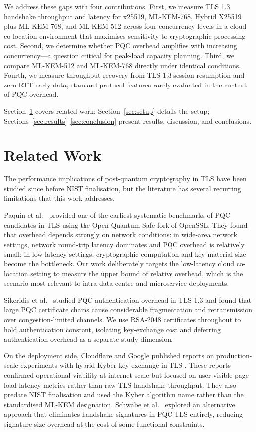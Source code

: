 \documentclass[conference]{IEEEtran}
\begin{document}
We address these gaps with four contributions. First, we measure TLS 1.3
handshake throughput and latency for x25519, ML-KEM-768,
Hybrid X25519 plus ML-KEM-768, and ML-KEM-512 across four concurrency levels in a cloud
co-location environment that maximises sensitivity to cryptographic processing cost.
Second, we determine whether PQC overhead amplifies with increasing concurrency---a
question critical for peak-load capacity planning. Third, we compare ML-KEM-512 and
ML-KEM-768 directly under identical conditions.
Fourth, we measure throughput recovery from TLS 1.3 session
resumption and zero-RTT early data, standard protocol features rarely
evaluated in the context of PQC overhead.

Section~\ref{sec:related} covers related work; Section~\ref{sec:setup} details the setup; Sections~\ref{sec:results}--\ref{sec:conclusion} present results, discussion, and conclusions.

\section{Related Work}
\label{sec:related}

The performance implications of post-quantum cryptography in TLS have been studied since
before NIST finalisation, but the literature has several recurring limitations that this
work addresses.

Paquin et al.~\cite{b8} provided one of the earliest systematic benchmarks of PQC
candidates in TLS using the Open Quantum Safe fork of OpenSSL. They found that overhead
depends strongly on network conditions: in wide-area network settings, network
round-trip latency dominates and PQC overhead is relatively small; in low-latency
settings, cryptographic computation and key material size become the bottleneck. Our work
deliberately targets the low-latency cloud co-location setting to measure the upper
bound of relative overhead, which is the scenario most relevant to intra-data-centre and
microservice deployments.

Sikeridis et al.~\cite{b9} studied PQC authentication overhead in TLS 1.3 and found
that large PQC certificate chains cause considerable fragmentation and retransmission
over congestion-limited channels. We use RSA-2048 certificates throughout to hold
authentication constant, isolating key-exchange cost and deferring authentication
overhead as a separate study dimension.

On the deployment side, Cloudflare and Google published reports on production-scale
experiments with hybrid Kyber key exchange in TLS \cite{b11}\cite{b12}\cite{b13}. These
reports confirmed operational viability at internet scale but focused on user-visible
page load latency metrics rather than raw TLS handshake throughput. They also predate
NIST finalisation and used the Kyber algorithm name rather than the standardised ML-KEM
designation. Schwabe et al.~\cite{b10} explored an alternative approach that eliminates
handshake signatures in PQC TLS entirely, reducing signature-size overhead at the cost
of some functional constraints.
\end{document}
